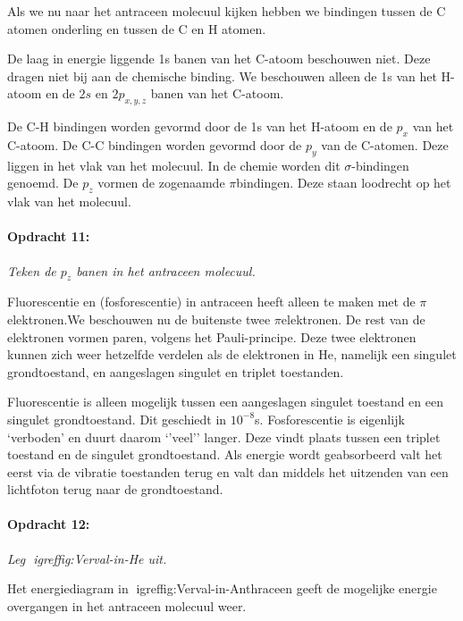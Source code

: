 Als we nu naar het antraceen molecuul kijken hebben we bindingen tussen
de C atomen onderling en tussen de C en H atomen.

De laag in energie liggende 1s banen van het C-atoom beschouwen niet.
Deze dragen niet bij aan de chemische binding. We beschouwen alleen
de 1s van het H-atoom en de $2s$ en $2p_{x,y,z}$ banen van het C-atoom.

De C-H bindingen worden gevormd door de 1s van het H-atoom en de $p_{x}$
van het C-atoom. De C-C bindingen worden gevormd door de $p_{y}$
van de C-atomen. Deze liggen in het vlak van het molecuul. In de chemie
worden dit $\sigma$-bindingen genoemd. De $p_{z}$ vormen de zogenaamde
$\pi$\textendash{}bindingen. Deze staan loodrecht op het vlak van
het molecuul.


\paragraph*{Opdracht 11:}

\emph{Teken de $p_{z}$ banen in het antraceen molecuul.}

Fluorescentie en (fosforescentie) in antraceen heeft alleen te maken
met de $\pi$\textendash{}elektronen.We beschouwen nu de buitenste
twee $\pi$\textendash{}elektronen. De rest van de elektronen vormen
paren, volgens het Pauli-principe. Deze twee elektronen kunnen zich
weer hetzelfde verdelen als de elektronen in He, namelijk een singulet
grondtoestand, en aangeslagen singulet en triplet toestanden.

Fluorescentie is alleen mogelijk tussen een aangeslagen singulet toestand
en een singulet grondtoestand. Dit geschiedt in $10^{-8}$s. Fosforescentie
is eigenlijk \textquoteleft{}verboden\textquoteright{} en duurt daarom
\textquoteleft{}\textquoteright{}veel\textquoteright{}\textquoteright{}
langer. Deze vindt plaats tussen een triplet toestand en de singulet
grondtoestand. Als energie wordt geabsorbeerd valt het eerst via de
vibratie toestanden terug en valt dan middels het uitzenden van een
lichtfoton terug naar de grondtoestand.


\paragraph*{Opdracht 12:}

\emph{Leg igref{fig:Verval-in-He} uit.}

Het energiediagram in igref{fig:Verval-in-Anthraceen} geeft
de mogelijke energie overgangen in het antraceen molecuul weer.

